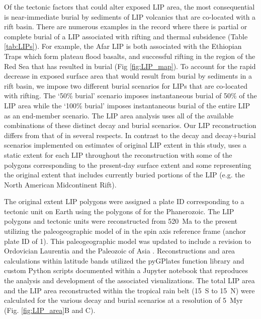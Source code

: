 \documentclass[11pt,letterpaper]{article}
\begin{document}
Of the tectonic factors that could alter exposed LIP area, the most consequential is near-immediate burial by sediments of LIP volcanics that are co-located with a rift basin. There are numerous examples in the record where there is partial or complete burial of a LIP associated with rifting and thermal subsidence (Table \ref{tab:LIPs}). For example, the Afar LIP is both associated with the Ethiopian Traps which form plateau flood basalts, and successful rifting in the region of the Red Sea that has resulted in burial (Fig \ref{fig:LIP_map}). To account for the rapid decrease in exposed surface area that would result from burial by sediments in a rift basin, we impose two different burial scenarios for LIPs that are co-located with rifting. The `50\% burial' scenario imposes instantaneous burial of 50$\%$ of the LIP area while the `100\% burial' imposes instantaneous burial of the entire LIP as an end-member scenario. The LIP area analysis uses all of the available combinations of these distinct decay and burial scenarios. Our LIP reconstruction differs from that of \citet{Johansson2018a} in several respects. In contrast to the decay and decay+burial scenarios implemented on estimates of original LIP extent in this study, \citet{Johansson2018a} uses a static extent for each LIP throughout the reconstruction with some of the polygons corresponding to the present-day surface extent and some representing the original extent that includes currently buried portions of the LIP (e.g. the North American Midcontinent Rift).

The original extent LIP polygons were assigned a plate ID corresponding to a tectonic unit on Earth using the polygons of \citet{Torsvik2016a} for the Phanerozoic. The LIP polygons and tectonic units were reconstructed from 520~Ma to the present utilizing the paleogeographic model of \citet{Torsvik2016a} in the spin axis reference frame (anchor plate ID of 1). This paleogeographic model was updated to include a revision to Ordovician Laurentia \citep{Swanson-Hysell2017a} and the Paleozoic of Asia \citep{Domeier2018a}. Reconstructions and area calculations within latitude bands utilized the pyGPlates function library and custom Python scripts documented within a Jupyter notebook that reproduces the analysis and development of the associated visualizations. The total LIP area and the LIP area reconstructed within the tropical rain belt (15\textdegree~S to 15\textdegree~N) were calculated for the various decay and burial scenarios at a resolution of 5~Myr (Fig. \ref{fig:LIP_area}B and C).
\end{document}

